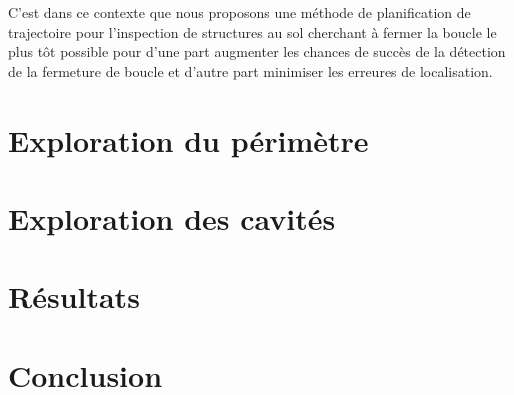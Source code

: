 C'est dans ce contexte que nous proposons une méthode de planification de trajectoire pour l'inspection de structures au sol cherchant à fermer la boucle le plus tôt possible pour d'une part augmenter les chances de succès de la détection de la fermeture de boucle et d'autre part minimiser les erreures de localisation.
 
\section{Exploration du périmètre}

\section{Exploration des cavités}

\section{Résultats}

\section{Conclusion}

